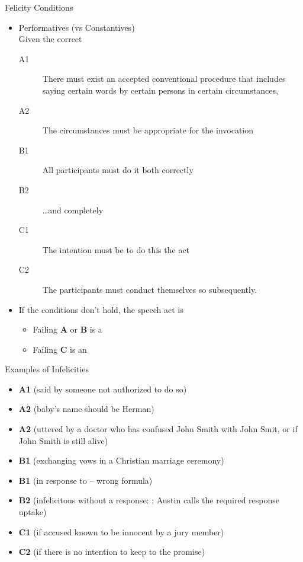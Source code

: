 \documentclass{beamer}
\begin{document}
\begin{frame}{Felicity Conditions}
\begin{itemize}
\item Performatives (vs Constantives) 
\\ Given the correct 
  \begin{description}
  \item[A1] There must exist an accepted conventional procedure that
    includes saying certain words by certain persons in certain
    circumstances,
  \item[A2] The circumstances must be appropriate for the invocation
  \item[B1] All participants must do it both correctly
  \item[B2] \ldots  and completely
  \item[C1] The intention must be to do this the act
  \item[C2] The participants must conduct themselves so subsequently.
  \end{description}
\item If the conditions don't hold, the speech act is 
  \begin{itemize}
  \item Failing \textbf{A} or \textbf{B} is a 
  \item Failing \textbf{C} is an 
  \end{itemize}
  \end{itemize}

\end{frame}

\begin{frame}{Examples of Infelicities}
\begin{itemize} 
\item \textbf{A1}  (said by someone not authorized to do so)
\item \textbf{A2}  (baby's name should
  be Herman)
\item \textbf{A2}  (uttered by a doctor who has confused John Smith
with John Smit, or if John Smith is still alive)
\item \textbf{B1}
 (exchanging vows in a Christian marriage ceremony)
\item \textbf{B1}
 (in response to  – wrong formula)
\item \textbf{B2}
 (infelicitous without a response: ; Austin calls the required response uptake)
\item \textbf{C1}
 (if accused known to be innocent by a jury member)
\item \textbf{C2}
 (if there is no intention to keep to the promise)
\end{itemize}


\end{frame}
\end{document}
